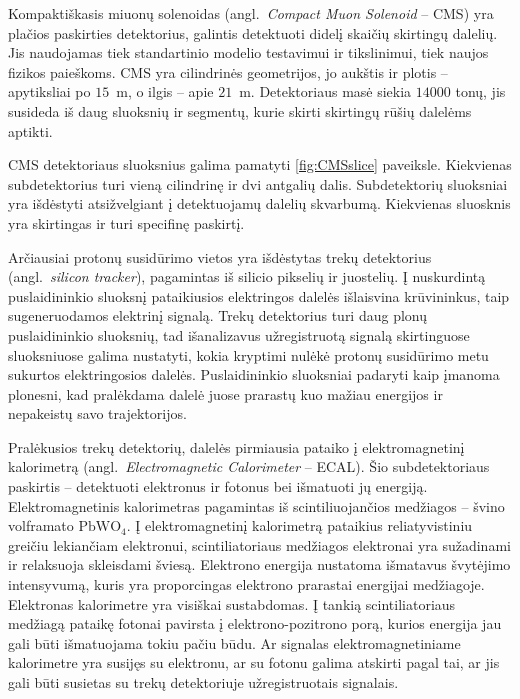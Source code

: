 \documentclass[a4paper, 12pt, oneside]{article}
\begin{document}
Kompaktiškasis miuonų solenoidas (angl.\ \textit{Compact Muon Solenoid} -- CMS) \cite{CMSexperiment}
yra plačios paskirties detektorius, galintis detektuoti didelį skaičių skirtingų dalelių.
Jis naudojamas tiek standartinio modelio testavimui ir tikslinimui, tiek naujos fizikos paieškoms.
CMS yra cilindrinės geometrijos, jo aukštis ir plotis -- apytiksliai po $15$~m, o ilgis --
apie $21$~m.
Detektoriaus masė siekia $14000$ tonų, jis susideda iš daug sluoksnių ir segmentų, kurie skirti
skirtingų rūšių dalelėms aptikti.

CMS detektoriaus sluoksnius galima pamatyti \ref{fig:CMSslice} paveiksle.
Kiekvienas subdetektorius turi vieną cilindrinę ir dvi antgalių dalis.
Subdetektorių sluoksniai yra išdėstyti atsižvelgiant į detektuojamų dalelių skvarbumą.
Kiekvienas sluosknis yra skirtingas ir turi specifinę paskirtį.

Arčiausiai protonų susidūrimo vietos yra išdėstytas trekų detektorius (angl.\ \textit{silicon tracker}),
pagamintas iš silicio pikselių ir juostelių.
Į nuskurdintą puslaidininkio sluoksnį pataikiusios elektringos dalelės išlaisvina krūvininkus, taip sugeneruodamos
elektrinį signalą.
Trekų detektorius turi daug plonų puslaidininkio sluoksnių, tad išanalizavus užregistruotą signalą skirtinguose
sluoksniuose galima nustatyti, kokia kryptimi nulėkė protonų susidūrimo metu sukurtos elektringosios dalelės.
Puslaidininkio sluoksniai padaryti kaip įmanoma plonesni, kad pralėkdama dalelė juose prarastų kuo mažiau energijos
ir nepakeistų savo trajektorijos.

Pralėkusios trekų detektorių, dalelės pirmiausia pataiko į elektromagnetinį kalorimetrą (angl.\ \textit{Electromagnetic Calorimeter} -- ECAL).
Šio subdetektoriaus paskirtis -- detektuoti elektronus ir fotonus bei išmatuoti jų energiją.
Elektromagnetinis kalorimetras pagamintas iš scintiliuojančios medžiagos -- švino volframato $\mathrm{PbWO}_{4}$.
Į elektromagnetinį kalorimetrą pataikius reliatyvistiniu greičiu lekiančiam elektronui, scintiliatoriaus medžiagos elektronai yra sužadinami
ir relaksuoja skleisdami šviesą.
Elektrono energija nustatoma išmatavus švytėjimo intensyvumą, kuris yra proporcingas elektrono prarastai energijai medžiagoje.
Elektronas kalorimetre yra visiškai sustabdomas.
Į tankią scintiliatoriaus medžiagą pataikę fotonai pavirsta į elektrono-pozitrono porą, kurios energija jau gali būti išmatuojama
tokiu pačiu būdu.
Ar signalas elektromagnetiniame kalorimetre yra susijęs su elektronu, ar su fotonu galima atskirti pagal tai, ar jis gali būti susietas su
trekų detektoriuje užregistruotais signalais.
\end{document}
